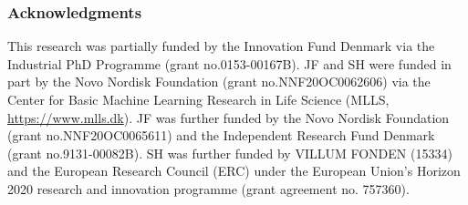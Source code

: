 \subsubsection*{Acknowledgments}
This research was partially funded by the Innovation Fund Denmark via the Industrial PhD Programme (grant no.\@ 0153-00167B). JF and SH were funded in part by the Novo Nordisk Foundation (grant no.\@ NNF20OC0062606) via the Center for Basic Machine Learning Research in Life Science (MLLS, \hyperlink{https://www.mlls.dk}{https://www.mlls.dk}). JF was further funded by the Novo Nordisk Foundation (grant no.\@ NNF20OC0065611) and the Independent Research Fund Denmark (grant no.\@ 9131-00082B). SH was further funded by VILLUM FONDEN (15334) and the European Research Council (ERC) under the European Union’s Horizon 2020 research and innovation programme (grant agreement no. 757360).

\fi
